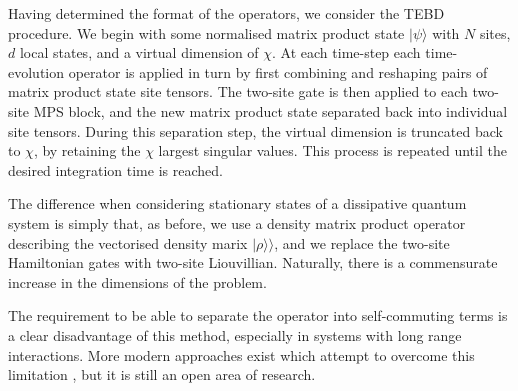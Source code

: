 Having determined the format of the operators, we consider the TEBD procedure. We begin with some normalised matrix product state \(|\psi\rangle\) with \(N\) sites, \(d\) local states, and a virtual dimension of \(\chi\). At each time-step each time-evolution operator is applied in turn by first combining and reshaping pairs of matrix product state site tensors. The two-site gate is then applied to each two-site MPS block, and the new matrix product state separated back into individual site tensors. During this separation step, the virtual dimension is truncated back to \(\chi\), by retaining the \(\chi\) largest singular values. This process is repeated until the desired integration time is reached.

The difference when considering stationary states of a dissipative quantum system is simply that, as before, we use a density matrix product operator describing the vectorised density marix \(| \rho \rangle\rangle\), and we replace the two-site Hamiltonian gates with two-site Liouvillian. Naturally, there is a commensurate increase in the dimensions of the problem.

The requirement to be able to separate the operator into self-commuting terms is a clear disadvantage of this method, especially in systems with long range interactions. More modern approaches exist which attempt to overcome this limitation \cite{Zaletel2015,Haegeman2016}, but it is still an open area of research.
